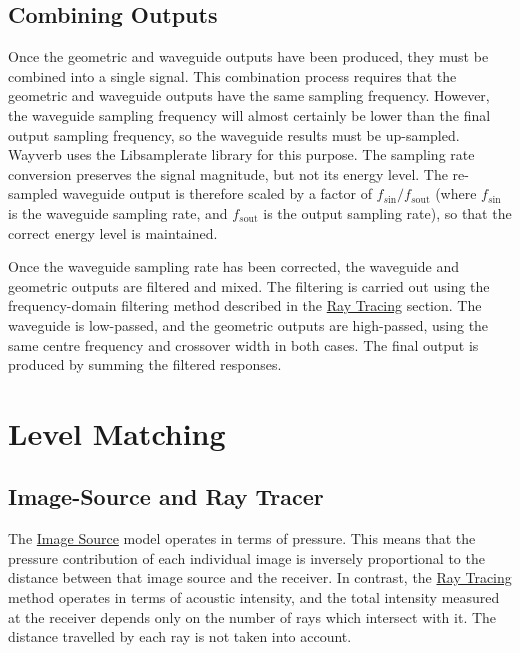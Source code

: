 \documentclass[]{scrreprt}
\begin{document}
\subsection{Combining Outputs}\label{combining-outputs}

Once the geometric and waveguide outputs have been produced, they must
be combined into a single signal. This combination process requires that
the geometric and waveguide outputs have the same sampling frequency.
However, the waveguide sampling frequency will almost certainly be lower
than the final output sampling frequency, so the waveguide results must
be up-sampled. Wayverb uses the Libsamplerate library for this purpose.
The sampling rate conversion preserves the signal magnitude, but not its
energy level. The re-sampled waveguide output is therefore scaled by a
factor of \(f_{s\text{in}} / f_{s\text{out}}\) (where \(f_{s\text{in}}\)
is the waveguide sampling rate, and \(f_{s\text{out}}\) is the output
sampling rate), so that the correct energy level is maintained.

Once the waveguide sampling rate has been corrected, the waveguide and
geometric outputs are filtered and mixed. The filtering is carried out
using the frequency-domain filtering method described in the
\href{\%7B\%7B\%20site.baseurl\%20\%7D\%7D\%7B\%\%20link\%20ray_tracer.md\%20\%\%7D}{Ray
Tracing} section. The waveguide is low-passed, and the geometric outputs
are high-passed, using the same centre frequency and crossover width in
both cases. The final output is produced by summing the filtered
responses.

\section{Level Matching}\label{level-matching}

\subsection{Image-Source and Ray
Tracer}\label{image-source-and-ray-tracer}

The
\href{\%7B\%7B\%20site.baseurl\%20\%7D\%7D\%7B\%\%20link\%20image_source.md\%20\%\%7D}{Image
Source} model operates in terms of pressure. This means that the
pressure contribution of each individual image is inversely proportional
to the distance between that image source and the receiver. In contrast,
the
\href{\%7B\%7B\%20site.baseurl\%20\%7D\%7D\%7B\%\%20link\%20ray_tracer.md\%20\%\%7D}{Ray
Tracing} method operates in terms of acoustic intensity, and the total
intensity measured at the receiver depends only on the number of rays
which intersect with it. The distance travelled by each ray is not taken
into account.
\end{document}
